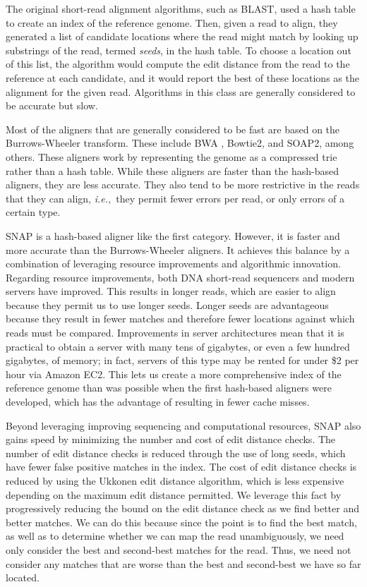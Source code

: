 \documentclass[twocolumn,10pt]{article}
\newcommand{\ie}{{\em i.e.,}~}
\begin{document}
The original short-read alignment algorithms, such as BLAST, used a hash table to create an index of the reference genome.  Then, given a read to align, they generated a list of candidate locations where the read might match by looking up substrings of the read, termed \textit{seeds}, in the hash table.  To choose a location out of this list, the algorithm would compute the edit distance from the read to the reference at each candidate, and it would report the best of these locations as the alignment for the given read.  Algorithms in this class are generally considered to be accurate but slow.

Most of the aligners that are generally considered to be fast are based on the Burrows-Wheeler transform.  These include BWA \cite{Li:2009}, Bowtie2, and SOAP2, among others.  These aligners work by representing the genome as a compressed trie rather than a hash table.  While these aligners are faster than the hash-based aligners, they are less accurate.  They also tend to be more restrictive in the reads that they can align, \ie they permit fewer errors per read, or only errors of a certain type.

SNAP is a hash-based aligner like the first category.  However, it is faster and more accurate than the Burrows-Wheeler aligners.  It achieves this balance by a combination of leveraging resource improvements and algorithmic innovation.  Regarding resource improvements, both DNA short-read sequencers and modern servers have improved.  This results in longer reads, which are easier to align because they permit us to use longer seeds.  Longer seeds are advantageous because they result in fewer matches and therefore fewer locations against which reads must be compared.  Improvements in server architectures mean that it is practical to obtain a server with many tens of gigabytes, or even a few hundred gigabytes, of memory; in fact, servers of this type may be rented for under \$2 per hour via Amazon EC2.  This lets us create a more comprehensive index of the reference genome than was possible when the first hash-based aligners were developed, which has the advantage of resulting in fewer cache misses.

Beyond leveraging improving sequencing and computational resources, SNAP also gains speed by minimizing the number and cost of edit distance checks.  The number of edit distance checks is reduced through the use of long seeds, which have fewer false positive matches in the index.  The cost of edit distance checks is reduced by using the Ukkonen edit distance algorithm, which is less expensive depending on the maximum edit distance permitted.  We leverage this fact by progressively reducing the bound on the edit distance check as we find better and better matches.  We can do this because since the point is to find the best match, as well as to determine whether we can map the read unambiguously, we need only consider the best and second-best matches for the read.  Thus, we need not consider any matches that are worse than the best and second-best we have so far located.  
\end{document}
